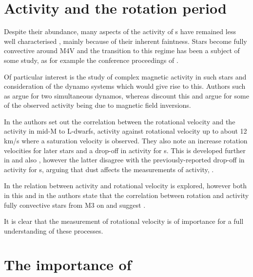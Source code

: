 \section{Activity and the rotation period}
\protect\label{section:introrotation}

Despite their abundance, many aspects of the activity of \rdwarf s have remained less well characterised
, mainly because of their inherent faintness. Stars become fully
convective  around M4V and the transition to this regime has been a subject of some study, as for
example the conference proceedings of \citet{stassun11}.

Of particular interest is the study of complex magnetic activity in such stars and consideration of the dynamo systems
which would give rise to this. Authors such as \citet{morin11} argue for two simultaneous dynamos, whereas
\citet{kitchatinov14} discount this and argue for some of the observed activity being due to magnetic field inversions.

In \citet{mohanty03} the authors set out the correlation between the  rotational velocity
{\vsini} and the activity in mid-M to L-dwarfs,  activity against rotational velocity up to about
12 km/s where a saturation velocity is observed. They also note an increase  rotation velocities for
later stars and a drop-off in activity for \ldwarf s. This is developed further in \citet{reiners08} and also
\citet{schmidt15}, however the latter disagree with the previously-reported drop-off in activity for \ldwarf s, arguing
that dust affects the measurements of activity, .

In \citet{mohanty02} the relation between activity and rotational velocity is explored, however both in this and in
\citet{mohanty03} the authors state that the correlation between rotation and activity  
fully convective stars from M3 on and suggest .

It is clear that the measurement of rotational velocity is of importance for a full understanding of these processes.

\section{The importance of {\ha}}
\protect\label{section:intohalpha}

